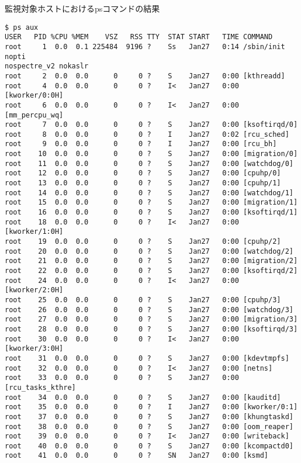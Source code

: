 \begin{itembox}[l]{監視対象ホストにおけるpsコマンドの結果}
    \label{itembox:result-ps}
    \begin{verbatim}
$ ps aux
USER   PID %CPU %MEM    VSZ   RSS TTY  STAT START   TIME COMMAND
root     1  0.0  0.1 225484  9196 ?    Ss   Jan27   0:14 /sbin/init nopti
nospectre_v2 nokaslr
root     2  0.0  0.0      0     0 ?    S    Jan27   0:00 [kthreadd]
root     4  0.0  0.0      0     0 ?    I<   Jan27   0:00 [kworker/0:0H]
root     6  0.0  0.0      0     0 ?    I<   Jan27   0:00 [mm_percpu_wq]
root     7  0.0  0.0      0     0 ?    S    Jan27   0:00 [ksoftirqd/0]
root     8  0.0  0.0      0     0 ?    I    Jan27   0:02 [rcu_sched]
root     9  0.0  0.0      0     0 ?    I    Jan27   0:00 [rcu_bh]
root    10  0.0  0.0      0     0 ?    S    Jan27   0:00 [migration/0]
root    11  0.0  0.0      0     0 ?    S    Jan27   0:00 [watchdog/0]
root    12  0.0  0.0      0     0 ?    S    Jan27   0:00 [cpuhp/0]
root    13  0.0  0.0      0     0 ?    S    Jan27   0:00 [cpuhp/1]
root    14  0.0  0.0      0     0 ?    S    Jan27   0:00 [watchdog/1]
root    15  0.0  0.0      0     0 ?    S    Jan27   0:00 [migration/1]
root    16  0.0  0.0      0     0 ?    S    Jan27   0:00 [ksoftirqd/1]
root    18  0.0  0.0      0     0 ?    I<   Jan27   0:00 [kworker/1:0H]
root    19  0.0  0.0      0     0 ?    S    Jan27   0:00 [cpuhp/2]
root    20  0.0  0.0      0     0 ?    S    Jan27   0:00 [watchdog/2]
root    21  0.0  0.0      0     0 ?    S    Jan27   0:00 [migration/2]
root    22  0.0  0.0      0     0 ?    S    Jan27   0:00 [ksoftirqd/2]
root    24  0.0  0.0      0     0 ?    I<   Jan27   0:00 [kworker/2:0H]
root    25  0.0  0.0      0     0 ?    S    Jan27   0:00 [cpuhp/3]
root    26  0.0  0.0      0     0 ?    S    Jan27   0:00 [watchdog/3]
root    27  0.0  0.0      0     0 ?    S    Jan27   0:00 [migration/3]
root    28  0.0  0.0      0     0 ?    S    Jan27   0:00 [ksoftirqd/3]
root    30  0.0  0.0      0     0 ?    I<   Jan27   0:00 [kworker/3:0H]
root    31  0.0  0.0      0     0 ?    S    Jan27   0:00 [kdevtmpfs]
root    32  0.0  0.0      0     0 ?    I<   Jan27   0:00 [netns]
root    33  0.0  0.0      0     0 ?    S    Jan27   0:00 [rcu_tasks_kthre]
root    34  0.0  0.0      0     0 ?    S    Jan27   0:00 [kauditd]
root    35  0.0  0.0      0     0 ?    I    Jan27   0:00 [kworker/0:1]
root    37  0.0  0.0      0     0 ?    S    Jan27   0:00 [khungtaskd]
root    38  0.0  0.0      0     0 ?    S    Jan27   0:00 [oom_reaper]
root    39  0.0  0.0      0     0 ?    I<   Jan27   0:00 [writeback]
root    40  0.0  0.0      0     0 ?    S    Jan27   0:00 [kcompactd0]
root    41  0.0  0.0      0     0 ?    SN   Jan27   0:00 [ksmd]
    \end{verbatim}
\end{itembox}

